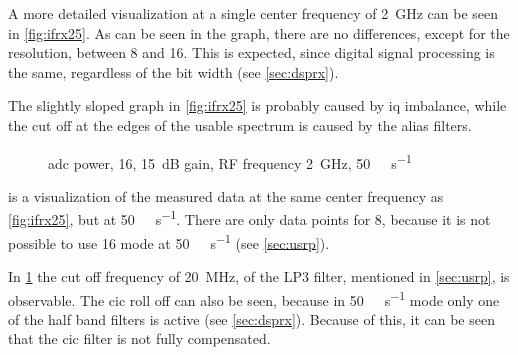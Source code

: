 \documentclass[12pt,a4paper,parskip=full,abstracton]{scrartcl}
\begin{document}
A more detailed visualization at a single center frequency of \SI{2}{\giga\hertz}
can be seen in \cref{fig:ifrx25}. As can be seen in the graph, there are no
differences, except for the resolution, between \SI{8}{\bit} and \SI{16}{\bit}. This
is expected, since digital signal processing is the same, regardless of the bit width
(see \cref{sec:dsprx}).

The slightly sloped graph in \cref{fig:ifrx25} is probably caused by \gls{iq} imbalance,
while the cut off at the edges of the usable spectrum is caused by the alias filters.

\begin{figure}[htb]
    \centering
{}
    \caption{\gls{adc} power, \SI{16}{\bit}, \SI{15}{\deci\bel} gain, RF frequency \SI{2}{\giga\hertz}, \SI{50}{\mega\samples\per\second}}
    \label{fig:ifrx50}
\end{figure}

 is a visualization of the measured data at the same center frequency
as \cref{fig:ifrx25}, but at \SI{50}{\mega\samples\per\second}. There are only
data points for \SI{8}{\bit}, because it is not possible to use \SI{16}{\bit} mode
at \SI{50}{\mega\samples\per\second} (see \cref{sec:usrp}).

In \cref{fig:ifrx50} the cut off frequency of \SI{20}{\mega\hertz}, of the LP3
filter, mentioned in \cref{sec:usrp}, is observable. The \gls{cic} roll off can also be seen, because
in \SI{50}{\mega\samples\per\second} mode only one of the half band filters is
active (see \cref{sec:dsprx}). Because of this, it can be seen that the \gls{cic} filter is not
fully compensated.
\end{document}
